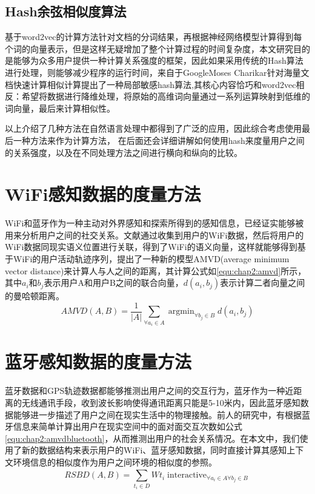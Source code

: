 \subsection{Hash余弦相似度算法}
基于word2vec的计算方法针对文档的分词结果，再根据神经网络模型计算得到每个词的向量表示，但是这样无疑增加了整个计算过程的时间复杂度，本文研究目的是能够为众多用户提供一种计算关系强度的框架，因此如果采用传统的Hash算法进行处理，则能够减少程序的运行时间，来自于GoogleMoses Charikar针对海量文档快速计算相似计算提出了一种局部敏感hash算法,其核心内容恰巧和word2vec相反：希望将数据进行降维处理，将原始的高维词向量通过一系列运算映射到低维的词向量，最后来计算相似性。
\par 以上介绍了几种方法在自然语言处理中都得到了广泛的应用，因此综合考虑使用最后一种方法来作为计算方法， 在后面还会详细讲解如何使用hash来度量用户之间的关系强度，以及在不同处理方法之间进行横向和纵向的比较。
\section{WiFi感知数据的度量方法}
WiFi和蓝牙作为一种主动对外界感知和探索所得到的感知信息，已经证实能够被用来分析用户之间的社交关系。文献\cite{hsu2007mining}通过收集到用户的WiFi数据，然后将用户的WiFi数据同现实语义位置进行关联，得到了WiFi的语义向量，这样就能够得到基于WiFi的用户活动轨迹序列，提出了一种新的模型AMVD(average minimum vector distance)来计算人与人之间的距离，其计算公式如\ref{equ:chap2:amvd}所示，其中$a_{i}$和$b_{j}$表示用户A和用户B之间的联合向量，$d(a_{i},b_{j})$表示计算二者向量之间的曼哈顿距离。
\begin{equation}
\label{equ:chap2:amvd}
AMVD(A,B)=\frac{1}{\left | A \right |}\sum_{\forall a_{i} \in A}^{ }  \mathop{\arg\min}_{\forall b_{j} \in B} d(a_{i},b_{j})
\end{equation}
\section{蓝牙感知数据的度量方法}
蓝牙数据和GPS轨迹数据都能够推测出用户之间的交互行为，蓝牙作为一种近距离的无线通讯手段，收到波长影响使得通讯距离只能是5-10米内，因此蓝牙感知数据能够进一步描述了用户之间在现实生活中的物理接触。前人的研究中，有根据蓝牙信息来简单计算出用户在现实空间中的面对面交互次数如公式\ref{equ:chap2:amvdbluetooth}，从而推测出用户的社会关系情况。在本文中，我们使用了新的数据结构来表示用户的WiFi、蓝牙感知数据，同时直接计算其感知上下文环境信息的相似度作为用户之间环境的相似度的参照。
\begin{equation}
\label{equ:chap2:amvdbluetooth}
RSBD(A,B)=\sum_{t_{i} \in D}^{ } Wt_{i} \mathop{interactive(a_{i},b_{j})}_{\forall a_{i} \in A \forall b_{j} \in B}
\end{equation}
